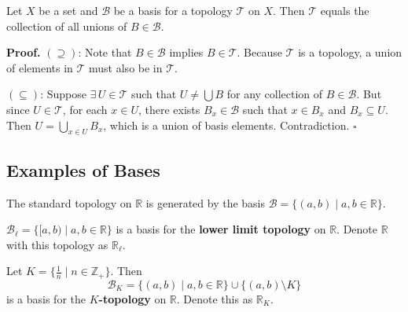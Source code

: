 \documentclass[11pt]{report}
\renewenvironment{proof}[1][Proof]{\noindent\textbf{#1.} }{\hfill$\square$\par\vspace{5pt}}
\begin{document}
\begin{lembox}
Let $X$ be a set and $\mathcal{B}$ be a basis for a topology $\mathcal{T}$ on $X$. Then $\mathcal{T}$ equals the collection of all unions of $B \in \mathcal{B}$.
\end{lembox}

\begin{proof}
$(\supseteq)$: Note that $B \in \mathcal{B}$ implies $B \in \mathcal{T}$. Because $\mathcal{T}$ is a topology, a union of elements in $\mathcal{T}$ must also be in $\mathcal{T}$.

$(\subseteq)$: Suppose $\exists\, U \in \mathcal{T}$ such that $U \neq \bigcup B$ for any collection of $B \in \mathcal{B}$. But since $U \in \mathcal{T}$, for each $x \in U$, there exists $B_x \in \mathcal{B}$ such that $x \in B_x$ and $B_x \subseteq U$. Then $U = \bigcup_{x \in U} B_x$, which is a union of basis elements. Contradiction.
\end{proof}

\subsection{Examples of Bases}

\begin{exbox}
The standard topology on $\mathbb{R}$ is generated by the basis $\mathcal{B} = \{(a,b) \mid a, b \in \mathbb{R}\}$.
\end{exbox}

\begin{exbox}
$\mathcal{B}_\ell = \{[a,b) \mid a, b \in \mathbb{R}\}$ is a basis for the \textbf{lower limit topology} on $\mathbb{R}$. Denote $\mathbb{R}$ with this topology as $\mathbb{R}_\ell$.
\end{exbox}

\begin{exbox}[$K$-Topology]
Let $K = \{\frac{1}{n} \mid n \in \mathbb{Z}_+\}$. Then 
\[\mathcal{B}_K = \{(a,b) \mid a, b \in \mathbb{R}\} \cup \{(a,b) \setminus K\}\]
is a basis for the \textbf{$K$-topology} on $\mathbb{R}$. Denote this as $\mathbb{R}_K$.
\end{exbox}
\end{document}
